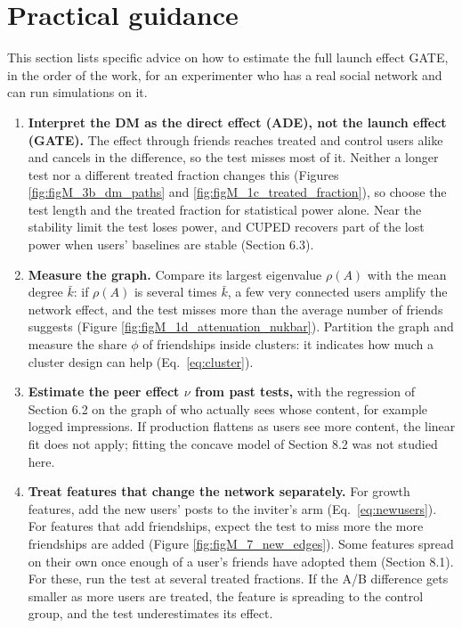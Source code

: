 \documentclass[final,5p,times,twocolumn,number]{elsarticle}
\begin{document}
\section{Practical guidance}

This section lists specific advice on how to estimate the full launch effect GATE, in the order of the work, for an experimenter who has a real social network and can run simulations on it.


\begin{enumerate}[itemsep=1pt,topsep=2pt,leftmargin=*]
\item \textbf{Interpret the DM as the direct effect (ADE), not the launch effect (GATE).} The effect through friends reaches treated and control users alike and cancels in the difference, so the test misses most of it. Neither a longer test nor a different treated fraction changes this (Figures \ref{fig:figM_3b_dm_paths} and \ref{fig:figM_1c_treated_fraction}), so choose the test length and the treated fraction for statistical power alone. Near the stability limit the test loses power, and CUPED recovers part of the lost power when users' baselines are stable (Section 6.3).
\item \textbf{Measure the graph.} Compare its largest eigenvalue $\rho(A)$  with the mean degree $\bar k$: if $\rho(A)$  is several times $\bar k$, a few very connected users amplify the network effect, and the test misses more than the average number of friends suggests (Figure \ref{fig:figM_1d_attenuation_nukbar}). Partition the graph and measure the share $\phi$  of friendships inside clusters: it indicates how much a cluster design can help (Eq.~\ref{eq:cluster}).
\item \textbf{Estimate the peer effect $\nu$  from past tests,} with the regression of Section 6.2 on the graph of who actually sees whose content, for example logged impressions. If production flattens as users see more content, the linear fit does not apply; fitting the concave model of Section 8.2 was not studied here.
\item \textbf{Treat features that change the network separately.} For growth features, add the new users' posts to the inviter's arm (Eq.~\ref{eq:newusers}). For features that add friendships, expect the test to miss more the more friendships are added (Figure \ref{fig:figM_7_new_edges}). Some features spread on their own once enough of a user's friends have adopted them (Section 8.1). For these, run the test at several treated fractions. If the A/B difference gets smaller as more users are treated, the feature is spreading to the control group, and the test underestimates its effect.

\end{enumerate}
\end{document}

